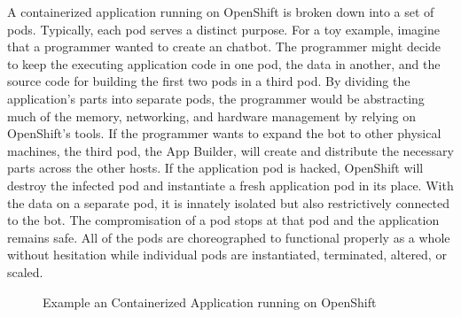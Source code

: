 \documentclass{article}
\begin{document}
A containerized application running on OpenShift is broken down into a set of pods. Typically, each pod serves a distinct purpose. For a toy example, imagine that a programmer wanted to create an chatbot. The programmer might decide to keep the executing application code in one pod, the data in another, and the source code for building the first two pods in a third pod. By dividing the application's parts into separate pods, the programmer would be abstracting much of the memory, networking, and hardware management by relying on OpenShift's tools. If the programmer wants to expand the bot to other physical machines, the third pod, the App Builder, will create and distribute the necessary parts across the other hosts. If the application pod is hacked, OpenShift will destroy the infected pod and instantiate a fresh application pod in its place. With the data on a separate pod, it is innately isolated but also restrictively connected to the bot. The compromisation of a pod stops at that pod and the application remains safe. All of the pods are choreographed to functional properly as a whole without hesitation while individual pods are instantiated, terminated, altered, or scaled.

\begin{figure}
\caption{Example an Containerized Application running on OpenShift}
\end{figure}
\end{document}
